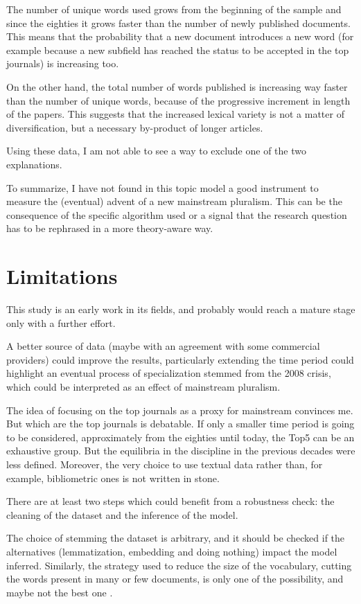 \documentclass[a4paper, 11pt, headings=standardclasses, tablecaptionsbelow]{scrartcl}
\begin{document}
The number of unique words used grows from the beginning of the sample and since the eighties it grows faster than the number of newly published documents. This means that the probability that a new document introduces a new word (for example because a new subfield has reached the status to be accepted in the top journals) is increasing too.

On the other hand, the total number of words published is increasing way faster than the number of unique words, because of the progressive increment in length of the papers. This suggests that the increased lexical variety is not a matter of diversification, but a necessary by-product of longer articles.

Using these data, I am not able to see a way to exclude one of the two explanations.

To summarize, I have not found in this topic model a good instrument to measure the (eventual) advent of a new mainstream pluralism. This can be the consequence of the specific algorithm used or a signal that the research question has to be rephrased in a more theory-aware way.

\section{Limitations}
This study is an early work in its fields, and probably would reach a mature stage only with a further effort.

A better source of data (maybe with an agreement with some commercial providers) could improve the results, particularly extending the time period could highlight an eventual process of specialization stemmed from the 2008 crisis, which could be interpreted as an effect of mainstream pluralism.

The idea of focusing on the top journals as a proxy for mainstream convinces me. But which are the top journals is debatable.
If only a smaller time period is going to be considered, approximately from the eighties until today, the Top5 can be an exhaustive group. But the equilibria in the discipline in the previous decades were less defined.
Moreover, the very choice to use textual data rather than, for example, bibliometric ones is not written in stone.

There are at least two steps which could benefit from a robustness check: the cleaning of the dataset and the inference of the model.

The choice of stemming the dataset is arbitrary, and it should be checked if the alternatives (lemmatization, embedding and doing nothing) impact the model inferred.
Similarly, the strategy used to reduce the size of the vocabulary, cutting the words present in many or few documents, is only one of the possibility, and maybe not the best one \parencite{gerlach2019}.
\end{document}
